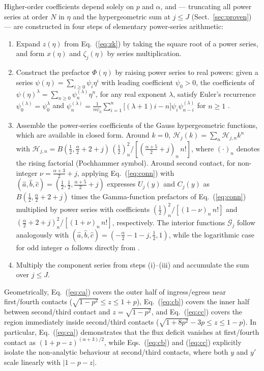 \documentclass[11pt]{article}
\begin{document}
Higher-order coefficients depend solely on $p$ and $\alpha$, and --- truncating all power series at order $N$ in $\eta$ and the hypergeometric sum at $j\le J$ (Sect.~\ref{sec:proven}) --- are constructed in four steps of elementary power-series arithmetic:
\begin{enumerate}
\item[(i)] Expand $z(\eta)$ from Eq.~(\ref{eq:zk}) by taking the square root of a power series, and form $x(\eta)$ and $\zeta_j(\eta)$ by series multiplication.
\item[(ii)] Construct the prefactor $\Phi(\eta)$ by raising power series to real powers: given a series $\psi(\eta)=\sum_{i\ge0}\psi_i\eta^i$ with leading coefficient $\psi_0>0$, the coefficients of $\psi(\eta)^\lambda=\sum_{n\ge0}\psi^{(\lambda)}_n\eta^n$, for any real exponent $\lambda$, satisfy Euler's recurrence $\psi^{(\lambda)}_0=\psi_0^\lambda$ and $\psi^{(\lambda)}_n=\frac{1}{n\psi_0}\sum_{i=1}^{n}\bigl[(\lambda+1)i-n\bigr]\psi_i\psi^{(\lambda)}_{n-i}$ for $n\ge1$ \citep[Sect.~4.7]{Knuth1997}.
\item[(iii)] Assemble the power-series coefficients of the Gauss hypergeometric functions, which are available in closed form. Around $k=0$, $\mathcal H_j(k)=\sum_n\mathcal H_{j,n}k^n$ with $\mathcal H_{j,n}=B(\tfrac12,\tfrac{\alpha}{2}+2+j)\,(\tfrac12)_n^2/[(\tfrac{\alpha+5}{2}+j)_n\,n!]$, where $(\cdot)_n$ denotes the rising factorial (Pochhammer symbol). Around second contact, for non-integer $\nu=\tfrac{\alpha+3}{2}+j$, applying Eq.~(\ref{eq:conn}) with $(\hat a,\hat b,\hat c)=(\tfrac12,\tfrac12,\tfrac{\alpha+5}{2}+j)$ expresses $U_j(y)$ and $C_j(y)$ as $B(\tfrac12,\tfrac{\alpha}{2}+2+j)$ times the Gamma-function prefactors of Eq.~(\ref{eq:conn}) multiplied by power series with coefficients $(\tfrac12)_n^2/[(1-\nu)_n\,n!]$ and $(\tfrac{\alpha}{2}+2+j)_n^2/[(1+\nu)_n\,n!]$, respectively. The interior functions $\mathcal G_j$ follow analogously with $(\hat a,\hat b,\hat c)=(-\tfrac{\alpha}{2}-1-j,\tfrac12,1)$, while the logarithmic case for odd integer $\alpha$ follows directly from \citet[15.8.10]{DLMF}.
\item[(iv)] Multiply the component series from steps (i)--(iii) and accumulate the sum over $j\le J$.
\end{enumerate}
Geometrically, Eq.~(\ref{eq:ca}) covers the outer half of ingress/egress near first/fourth contacts ($\sqrt{1-p^2}\le z\le1+p$), Eq.~(\ref{eq:cb}) covers the inner half between second/third contact and $z=\sqrt{1-p^2}$, and Eq.~(\ref{eq:cc}) covers the region immediately inside second/third contacts ($\sqrt{1+8p^2}-3p\le z\le1-p$). In particular, Eq.~(\ref{eq:ca}) demonstrates that the flux deficit vanishes at first/fourth contact as $(1+p-z)^{(\alpha+3)/2}$, while Eqs.~(\ref{eq:cb}) and (\ref{eq:cc}) explicitly isolate the non-analytic behaviour at second/third contacts, where both $y$ and $y'$ scale linearly with $|1-p-z|$.
\end{document}
